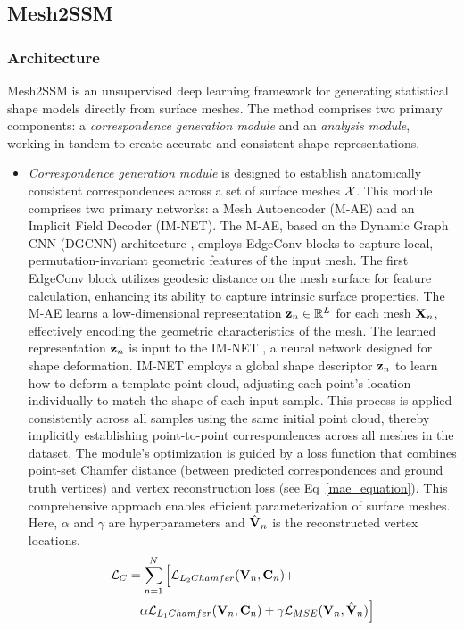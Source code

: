 \subsection{Mesh2SSM}\label{mesh2ssm}

\subsubsection{Architecture}
Mesh2SSM is an unsupervised deep learning framework for generating statistical shape models directly from surface meshes. The method comprises two primary components: a \textit{correspondence generation module} and an \textit{analysis module}, working in tandem to create accurate and consistent shape representations.
\begin{itemize}
    \item \textit{Correspondence generation module} is designed to establish anatomically consistent correspondences across a set of surface meshes \(\mathcal{X}\). This module comprises two primary networks: a Mesh Autoencoder (M-AE) and an Implicit Field Decoder (IM-NET). The M-AE, based on the Dynamic Graph CNN (DGCNN) architecture \cite{wang2019dynamic}, employs EdgeConv blocks to capture local, permutation-invariant geometric features of the input mesh. The first EdgeConv block utilizes geodesic distance on the mesh surface for feature calculation, enhancing its ability to capture intrinsic surface properties. The M-AE learns a low-dimensional representation \(\mathbf{z}_n \in \mathbb{R}^L\) for each mesh \(\mathbf{X}_n\), effectively encoding the geometric characteristics of the mesh. The learned representation \(\mathbf{z}_n\) is input to the IM-NET \cite{chen2019net}, a neural network designed for shape deformation. IM-NET employs a global shape descriptor \(\mathbf{z}_n\) to learn how to deform a template point cloud, adjusting each point's location individually to match the shape of each input sample. This process is applied consistently across all samples using the same initial point cloud, thereby implicitly establishing point-to-point correspondences across all meshes in the dataset. The module's optimization is guided by a loss function that combines point-set Chamfer distance (between predicted correspondences and ground truth vertices) and vertex reconstruction loss (see Eq~\ref{mae_equation}). This comprehensive approach enables efficient parameterization of surface meshes. Here, \(\alpha\) and \(\gamma\) are hyperparameters and \(\hat{\mathbf{V}}_n\) is the reconstructed vertex locations.  
    \begin{equation}\label{mae_equation}
    \begin{aligned}
    \mathcal{L}_{C} &= \sum_{n=1}^N \Big[ \mathcal{L}_{L_2 Chamfer}(\mathbf{V}_n,\mathbf{C}_n) 
    + \\ 
    &\quad  \alpha \mathcal{L}_{L_1 Chamfer}(\mathbf{V}_n,\mathbf{C}_n) 
    + \gamma \mathcal{L}_{MSE}(\mathbf{V}_n, \hat{\mathbf{V}}_n) \Big]
    \end{aligned}
    \end{equation}


\end{itemize}
